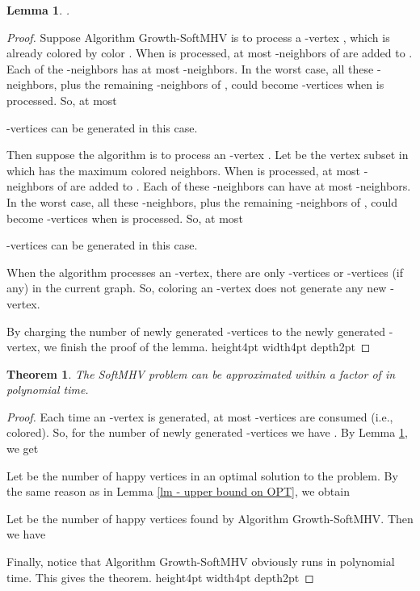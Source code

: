 \documentclass[11pt]{article}
\newtheorem{theorem}{Theorem}[section]
\newtheorem{lemma}{Lemma}[section]
\newcommand{\qed}{\vrule height4pt width4pt depth2pt}
\begin{document}
\begin{lemma}
\label{lm - lower bound on |H^new|, Growth-SoftMHV}
.
\end{lemma}
\begin{proof}
Suppose Algorithm {\sc Growth-SoftMHV} is to process a -vertex ,
which is already colored by color .
When  is processed, at most  -neighbors
of  are added to . Each of the -neighbors has at most
 -neighbors.
In the worst case, all these -neighbors,
plus the remaining -neighbors of , could become -vertices
when  is processed. So, at most

-vertices can be generated in this case.

Then suppose the algorithm is to process an -vertex . Let
 be the vertex subset in which  has the maximum colored neighbors.
When  is processed, at most  -neighbors
of  are added to . Each of these -neighbors can have at most
 -neighbors. In the worst case,
all these -neighbors, plus the remaining -neighbors of ,
could become -vertices when  is processed.
So, at most

-vertices can be generated in this case.

When the algorithm processes an -vertex, there are only
-vertices or -vertices (if any) in the current graph.
So, coloring an -vertex does not generate any new -vertex.

By charging the number of newly generated -vertices to the newly
generated -vertex, we finish the proof of the lemma.
\qed
\end{proof}


\begin{theorem}
The SoftMHV problem can be approximated within a factor of
 in polynomial time.
\end{theorem}
\begin{proof}
Each time an -vertex is generated, at most 
-vertices are consumed (i.e., colored).
So, for the number of newly generated -vertices we have
.
By Lemma \ref{lm - lower bound on |H^new|, Growth-SoftMHV}, we get


Let  be the number of happy vertices in an optimal solution to
the problem. By the same reason as in Lemma \ref{lm - upper bound on OPT},
we obtain


Let  be the number of happy vertices found by Algorithm
{\sc Growth-SoftMHV}. Then we have


Finally, notice that Algorithm {\sc Growth-SoftMHV} obviously runs
in polynomial time. This gives the theorem.
\qed
\end{proof}
\end{document}
